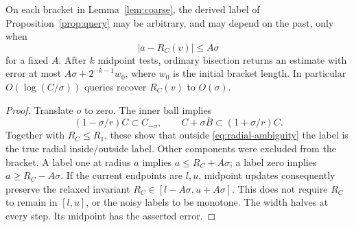 \begin{lemma}
\label{lem:bisection}
On each bracket in Lemma~\ref{lem:coarse}, the derived label of
Proposition~\ref{prop:query} may be arbitrary, and may depend on the
past, only when
\begin{equation}\label{eq:radial-ambiguity}
                       |a-R_C(v)|\le A\sigma
\end{equation}
for a fixed $A$. After $k$ midpoint tests, ordinary bisection returns
an estimate with error at most $A\sigma+2^{-k-1}w_0$, where $w_0$
is the initial bracket length. In particular $O(\log(C/\sigma))$
queries recover $R_C(v)$ to $O(\sigma)$.
\end{lemma}
\begin{proof}
Translate $o$ to zero. The inner ball implies
\[
 (1-\sigma/r)C\subset C_{-\sigma},\qquad
 C+\sigma\overline B\subset(1+\sigma/r)C.
\]
Together with $R_C\le R_1$, these show that outside
\eqref{eq:radial-ambiguity} the label is the true radial inside/outside
label. Other components were excluded from the bracket. A label one
at radius $a$ implies $a\le R_C+A\sigma$; a label zero implies
$a\ge R_C-A\sigma$. If the current endpoints are $l,u$, midpoint
updates consequently preserve the relaxed invariant
$R_C\in[l-A\sigma,u+A\sigma]$. This does not require $R_C$ to remain
in $[l,u]$, or the noisy labels to be monotone. The width halves at
every step. Its midpoint has the asserted error.
\end{proof}

